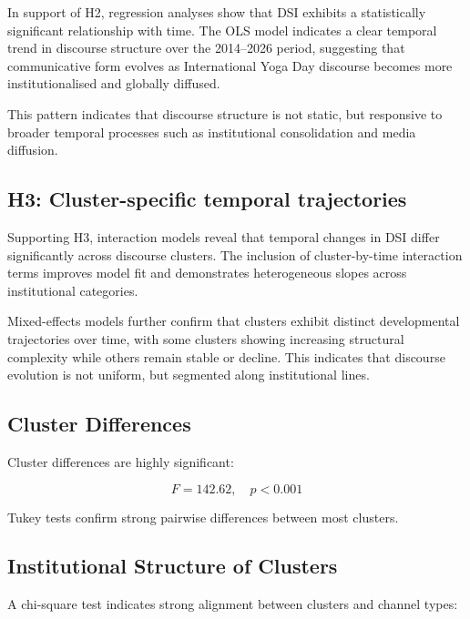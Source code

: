\documentclass[11pt]{article}
\begin{document}
In support of H2, regression analyses show that DSI exhibits a statistically significant relationship with time. The OLS model indicates a clear temporal trend in discourse structure over the 2014–2026 period, suggesting that communicative form evolves as International Yoga Day discourse becomes more institutionalised and globally diffused.

This pattern indicates that discourse structure is not static, but responsive to broader temporal processes such as institutional consolidation and media diffusion.

\subsection{H3: Cluster-specific temporal trajectories}

Supporting H3, interaction models reveal that temporal changes in DSI differ significantly across discourse clusters. The inclusion of cluster-by-time interaction terms improves model fit and demonstrates heterogeneous slopes across institutional categories.

Mixed-effects models further confirm that clusters exhibit distinct developmental trajectories over time, with some clusters showing increasing structural complexity while others remain stable or decline. This indicates that discourse evolution is not uniform, but segmented along institutional lines.


\subsection{Cluster Differences}



Cluster differences are highly significant:



\begin{equation*}
F = 142.62,\quad p < 0.001
\end{equation*}


Tukey tests confirm strong pairwise differences between most clusters.



\subsection{Institutional Structure of Clusters}



A chi-square test indicates strong alignment between clusters and channel types:
\end{document}
